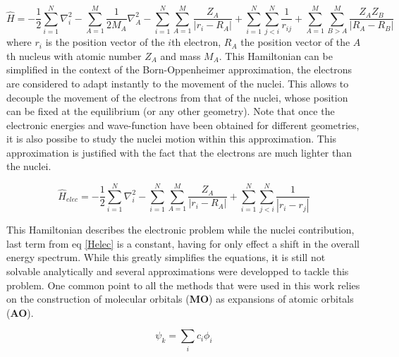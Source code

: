 \documentclass[12pt]{report}
\numberwithin{equation}{section}
\begin{document}
\begin{equation}\label{Helec}
    \hat{H}=-\frac{1}{2}\sum_{i=1}^{N}\nabla_i^2-\sum_{A=1}^{M}\frac{1}{2M_A}\nabla_A^2%
    -\sum_{i=1}^{N}\sum_{A=1}^{M}\frac{Z_A}{|r_i-R_A|}+\sum_{i=1}^{N}\sum_{j<i}^{N}\frac{1}{r_{ij}}%
    +\sum_{A=1}^{M}\sum_{B>A}^{M}\frac{Z_A Z_B}{|R_A-R_B|}
\end{equation}
where $r_i$ is the position vector of the $i$th electron, $R_A$ the position vector of the $A$th nucleus with atomic number $Z_A$ and mass $M_A$.
This Hamiltonian can be simplified in the context of the Born-Oppenheimer approximation, the electrons are considered to adapt instantly to the movement of the nuclei.
This allows to decouple the movement of the electrons from that of the nuclei, whose position can be fixed at the equilibrium (or any other geometry).
Note that once the electronic energies and wave-function have been obtained for different geometries, it is also possibe to study the nuclei motion within this approximation.
This approximation is justified with the fact that the electrons are much lighter than the nuclei. 

\begin{equation}\label{HBO}
    \hat{H}_{elec}=-\frac{1}{2}\sum_{i=1}^{N}\nabla_i^2%
    -\sum_{i=1}^{N}\sum_{A=1}^{M}\frac{Z_A}{|r_i-R_A|}+\sum_{i=1}^{N}\sum_{j<i}^{N}\frac{1}{|r_i-r_j|}%
\end{equation}

This Hamiltonian describes the electronic problem while the nuclei contribution, last term from eq \ref{Helec} is a constant, having for only effect a shift in the overall energy spectrum. 
While this greatly simplifies the equations, it is still not solvable analytically and several approximations were developped to tackle this problem. %
One common point to all the methods that were used in this work relies on the construction of molecular orbitals (\textbf{MO}) as expansions of atomic orbitals (\textbf{AO}).

\begin{equation}
    \psi_k=\sum_{i}c_i \phi_i
\end{equation}
\end{document}
